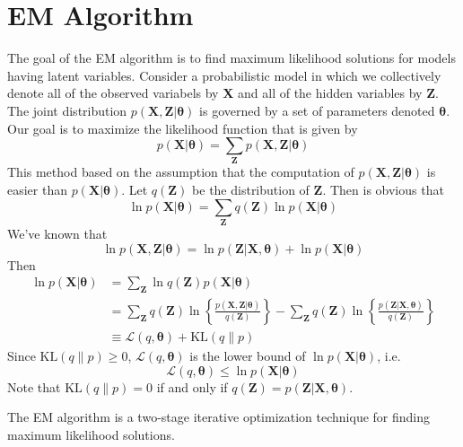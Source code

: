 \documentclass{article}
\begin{document}
    \section{EM Algorithm}
        The goal of the EM algorithm is to find maximum likelihood solutions for models having latent variables. Consider a probabilistic model in which we collectively denote all of the observed variabels by \textbf{X} and all of the hidden variables by \textbf{Z}. The joint distribution $p(\mathbf{X},\mathbf{Z}|\boldsymbol{\theta})$ is governed by a set of parameters denoted $\boldsymbol{\theta}$. Our goal is to maximize the likelihood function that is given by
        \[
            p(\mathbf{X}|\boldsymbol{\theta})=\sum_{\mathbf{Z}}p(\mathbf{X}, \mathbf{Z}|\boldsymbol{\theta})
        \]
        This method based on the assumption that the computation of $p(\mathbf{X}, \mathbf{Z}|\boldsymbol{\theta})$ is easier than $p(\mathbf{X}|\boldsymbol{\theta})$.
        Let $q(\mathbf{Z})$ be the distribution of $\mathbf{Z}$. Then is obvious that
        \[
            \ln p(\mathbf{X}|\boldsymbol{\theta})=\sum_{\mathbf{Z}}q(\mathbf{Z})\ln p(\mathbf{X}|\boldsymbol{\theta})
        \]
        We've known that
        \[
            \ln p(\mathbf{X},\mathbf{Z}|\boldsymbol{\theta}) = \ln p(\mathbf{Z}|\mathbf{X},\boldsymbol{\theta})+ \ln p(\mathbf{X}|\boldsymbol{\theta})
        \]
        Then
        \begin{align*}
            \ln p(\mathbf{X}|\boldsymbol{\theta})&=\sum_{\mathbf{Z}}\ln q(\mathbf{Z})p(\mathbf{X}|\boldsymbol{\theta})\\
            &=\sum_{\mathbf{Z}}q(\mathbf{Z})\ln\left\{\frac{p(\mathbf{X},\mathbf{Z}|\boldsymbol{\theta})}{q(\mathbf{Z})}\right\}-\sum_{\mathbf{Z}}q(\mathbf{Z})\ln\left\{\frac{p(\mathbf{Z}|\mathbf{X},\boldsymbol{\theta})}{q(\mathbf{Z})}\right\}\\
            &\equiv\mathcal{L}(q,\boldsymbol{\theta})+\mathrm{KL}(q\|p)
        \end{align*}
        Since $\mathrm{KL}(q\|p)\geq0$, $\mathcal{L}(q,\boldsymbol{\theta})$ is the lower bound of $\ln p(\mathbf{X}|\boldsymbol{\theta})$, i.e.
        \[
            \mathcal{L}(q,\boldsymbol{\theta})\leq\ln p(\mathbf{X}|\boldsymbol{\theta})
        \]
        Note that $\mathrm{KL}(q\|p)=0$ if and only if $q(\mathbf{Z})=p(\mathbf{Z}|\mathbf{X},\boldsymbol{\theta})$.
        
        The EM algorithm is a two-stage iterative optimization technique for finding maximum likelihood solutions.
\end{document}
